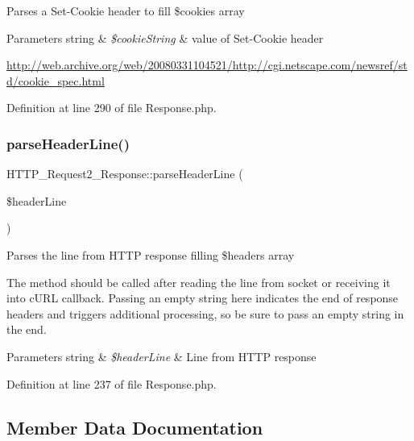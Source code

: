 Parses a Set-\/\+Cookie header to fill \$cookies array


\begin{DoxyParams}[1]{Parameters}
string & {\em \$cookie\+String} & value of Set-\/\+Cookie header\\
\hline
\end{DoxyParams}
\hyperlink{}{http\+://web.\+archive.\+org/web/20080331104521/http\+://cgi.\+netscape.\+com/newsref/std/cookie\+\_\+spec.\+html}

Definition at line 290 of file Response.\+php.

\hypertarget{classHTTP__Request2__Response_a04cced85d4e024e5f41bb326aeba4bb8}{}\label{classHTTP__Request2__Response_a04cced85d4e024e5f41bb326aeba4bb8} 
\subsubsection{\texorpdfstring{parse\+Header\+Line()}{parseHeaderLine()}}
{\footnotesize\ttfamily H\+T\+T\+P\+\_\+\+Request2\+\_\+\+Response\+::parse\+Header\+Line (\begin{DoxyParamCaption}\item[{}]{\$header\+Line }\end{DoxyParamCaption})}

Parses the line from H\+T\+TP response filling \$headers array

The method should be called after reading the line from socket or receiving it into c\+U\+RL callback. Passing an empty string here indicates the end of response headers and triggers additional processing, so be sure to pass an empty string in the end.


\begin{DoxyParams}[1]{Parameters}
string & {\em \$header\+Line} & Line from H\+T\+TP response \\
\hline
\end{DoxyParams}


Definition at line 237 of file Response.\+php.



\subsection{Member Data Documentation}
\hypertarget{classHTTP__Request2__Response_a3f5cdce9656ed7bd31859b5778169f66}{}\label{classHTTP__Request2__Response_a3f5cdce9656ed7bd31859b5778169f66} 
